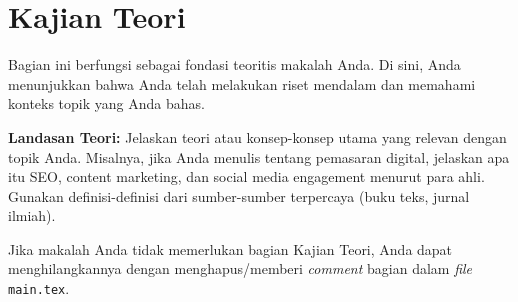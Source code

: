 %
%
%
\chapter{Kajian Teori}


Bagian ini berfungsi sebagai fondasi teoritis makalah Anda. Di sini, Anda menunjukkan bahwa Anda telah melakukan riset mendalam dan memahami konteks topik yang Anda bahas.

\textbf{Landasan Teori:} Jelaskan teori atau konsep-konsep utama yang relevan dengan topik Anda. Misalnya, jika Anda menulis tentang pemasaran digital, jelaskan apa itu SEO, content marketing, dan social media engagement menurut para ahli. Gunakan definisi-definisi dari sumber-sumber terpercaya (buku teks, jurnal ilmiah).

Jika makalah Anda tidak memerlukan bagian Kajian Teori, Anda dapat menghilangkannya dengan menghapus/memberi \textit{comment} bagian \verb|| dalam \textit{file} \texttt{main.tex}.
